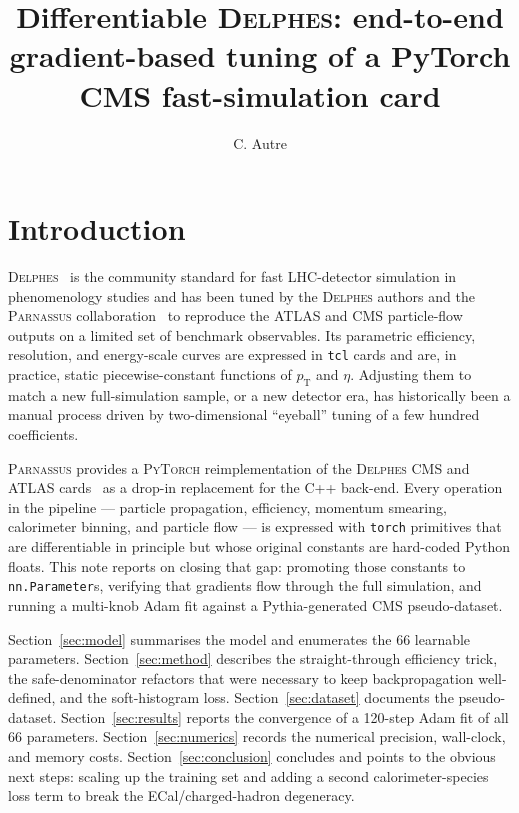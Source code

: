 \documentclass[a4paper,11pt]{article}
\title{Differentiable \textsc{Delphes}: end-to-end gradient-based tuning of a
PyTorch CMS fast-simulation card}
\author[a]{C. Autre\note{Corresponding author.}}
\affiliation[a]{\textsc{Parnassus} developers\\
  on behalf of the \textsc{Parnassus} collaboration}
\begin{document}
\maketitle
\flushbottom

\section{Introduction}

\textsc{Delphes}~\cite{delphes3} is the community standard for fast
LHC-detector simulation in phenomenology studies and has been tuned by
the \textsc{Delphes} authors and the \textsc{Parnassus}
collaboration~\cite{parnassus} to reproduce the ATLAS and CMS
particle-flow outputs on a limited set of benchmark observables. Its
parametric efficiency, resolution, and energy-scale curves are
expressed in \texttt{tcl} cards and are, in practice, static
piecewise-constant functions of $p_\mathrm{T}$ and $\eta$. Adjusting
them to match a new full-simulation sample, or a new detector era, has
historically been a manual process driven by two-dimensional
``eyeball'' tuning of a few hundred coefficients.

\textsc{Parnassus} provides a \textsc{PyTorch} reimplementation of the
\textsc{Delphes} CMS and ATLAS cards~\cite{parnassus} as a drop-in
replacement for the C++ back-end. Every operation in the pipeline ---
particle propagation, efficiency, momentum smearing, calorimeter
binning, and particle flow --- is expressed with \texttt{torch}
primitives that are differentiable in principle but whose original
constants are hard-coded Python floats. This note reports on closing
that gap: promoting those constants to \texttt{nn.Parameter}s,
verifying that gradients flow through the full simulation, and running
a multi-knob Adam fit against a Pythia-generated CMS pseudo-dataset.

Section~\ref{sec:model} summarises the model and enumerates the 66
learnable parameters. Section~\ref{sec:method} describes the
straight-through efficiency trick, the safe-denominator refactors that
were necessary to keep backpropagation well-defined, and the
soft-histogram loss. Section~\ref{sec:dataset} documents the
pseudo-dataset. Section~\ref{sec:results} reports the convergence of a
120-step Adam fit of all 66 parameters.
Section~\ref{sec:numerics} records the numerical precision, wall-clock,
and memory costs. Section~\ref{sec:conclusion} concludes and points to
the obvious next steps: scaling up the training set and adding a second
calorimeter-species loss term to break the ECal/charged-hadron
degeneracy.
\end{document}
